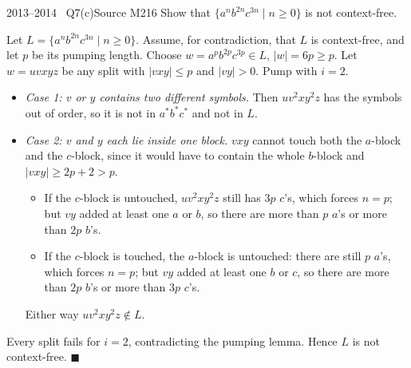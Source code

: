 \documentclass[11pt,a4paper]{article}
\begin{document}
\begin{question}{2013--2014 \textbullet\ Q7(c)}{Source M21}{6}
Show that $\{a^nb^{2n}c^{3n}\mid n\ge0\}$ is not context-free.
\end{question}
\begin{solution}
Let $L=\{a^nb^{2n}c^{3n}\mid n\ge0\}$. Assume, for contradiction, that $L$ is context-free, and let $p$ be its pumping length. Choose $w=a^pb^{2p}c^{3p}\in L$, $|w|=6p\ge p$. Let $w=uvxyz$ be any split with $|vxy|\le p$ and $|vy|>0$. Pump with $i=2$.
\begin{itemize}
\item \emph{Case 1: $v$ or $y$ contains two different symbols.} Then $uv^2xy^2z$ has the symbols out of order, so it is not in $a^*b^*c^*$ and not in $L$.
\item \emph{Case 2: $v$ and $y$ each lie inside one block.} $vxy$ cannot touch both the $a$-block and the $c$-block, since it would have to contain the whole $b$-block and $|vxy|\ge2p+2>p$.
 \begin{itemize}
 \item If the $c$-block is untouched, $uv^2xy^2z$ still has $3p$ $c$'s, which forces $n=p$; but $vy$ added at least one $a$ or $b$, so there are more than $p$ $a$'s or more than $2p$ $b$'s.
 \item If the $c$-block is touched, the $a$-block is untouched: there are still $p$ $a$'s, which forces $n=p$; but $vy$ added at least one $b$ or $c$, so there are more than $2p$ $b$'s or more than $3p$ $c$'s.
 \end{itemize}
 Either way $uv^2xy^2z\notin L$.
\end{itemize}
Every split fails for $i=2$, contradicting the pumping lemma. Hence $L$ is not context-free. \hfill$\blacksquare$
\end{solution}
\end{document}
